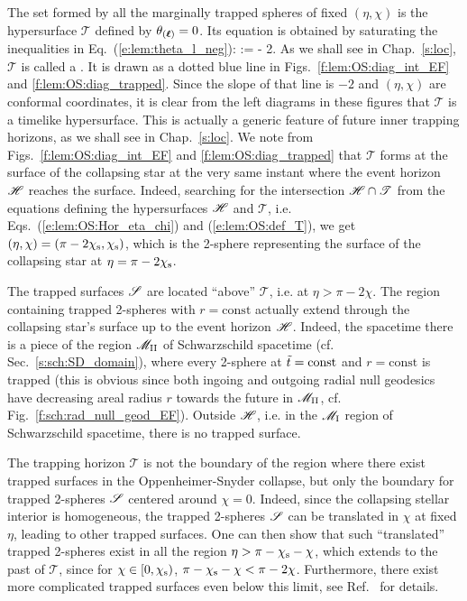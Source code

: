The set formed by all the marginally trapped spheres
of fixed $(\eta,\chi)$
is the hypersurface $\mathscr{T}$ defined by $\theta_{(\bm{\ell})} = 0$.
Its equation is obtained by saturating the inequalities
in Eq.~(\ref{e:lem:theta_l_neg}):
\be \label{e:lem:OS:def_T}
    :\qquad \eta = \pi - 2\chi.
\ee
As we shall see in
Chap.~\ref{s:loc}, $\mathscr{T}$ is called a
.
It is drawn as a dotted blue line in Figs.~\ref{f:lem:OS:diag_int_EF}
and \ref{f:lem:OS:diag_trapped}. Since the slope of that line is $-2$ and
$(\eta,\chi)$ are conformal coordinates, it is clear from the left diagrams
in these figures that $\mathscr{T}$ is a timelike hypersurface. This is
actually a generic feature of future inner trapping horizons, as we shall
see in Chap.~\ref{s:loc}. We note from Figs.~\ref{f:lem:OS:diag_int_EF}
and \ref{f:lem:OS:diag_trapped} that $\mathscr{T}$ forms at the surface of the
collapsing star at the very same instant where the event horizon $\mathscr{H}$
reaches the surface.
Indeed, searching for the intersection $\mathscr{H}\cap\mathscr{T}$ from the equations
defining the hypersurfaces $\mathscr{H}$ and $\mathscr{T}$, i.e. Eqs.~(\ref{e:lem:OS:Hor_eta_chi})
and (\ref{e:lem:OS:def_T}), we get
$(\eta,\chi) = (\pi - 2\chi_{\rm s}, \chi_{\rm s})$, which is the 2-sphere
representing the surface of the collapsing star at $\eta=\pi - 2 \chi_{\rm s}$.

The trapped surfaces $\mathscr{S}$ are located ``above'' $\mathscr{T}$, i.e. at
$\eta > \pi - 2 \chi$. The region containing trapped 2-spheres with $r=\mathrm{const}$ actually extend through the collapsing star's surface up to the event horizon $\mathscr{H}$. Indeed, the spacetime there
is a piece of the region $\mathscr{M}_{\rm II}$ of Schwarzschild spacetime (cf. Sec.~\ref{s:sch:SD_domain}),
where every 2-sphere at ${\tilde t} = \mathrm{const}$ and $r=\mathrm{const}$ is trapped (this is obvious
since both ingoing and outgoing radial null geodesics have decreasing areal radius $r$
towards the future in $\mathscr{M}_{\rm II}$, cf. Fig.~\ref{f:sch:rad_null_geod_EF}).
Outside $\mathscr{H}$, i.e. in the $\mathscr{M}_{\rm I}$ region of Schwarzschild spacetime, there is no trapped
surface.

\begin{remark}
The trapping horizon $\mathscr{T}$ is not the boundary of the region where there
exist trapped surfaces
in the Oppenheimer-Snyder collapse, but only the boundary for trapped 2-spheres $\mathscr{S}$
centered around $\chi=0$.
Indeed, since the collapsing stellar interior
is homogeneous, the trapped 2-spheres $\mathscr{S}$ can
be translated in $\chi$ at fixed $\eta$, leading to other trapped surfaces.
One can then show that such ``translated'' trapped 2-spheres exist in all the region
$\eta > \pi - \chi_{\rm s} - \chi$, which extends to the past of $\mathscr{T}$,
since for $\chi\in[0, \chi_{\rm s})$,  %
$ \pi - \chi_{\rm s} - \chi < \pi - 2\chi$.
Furthermore, there exist more complicated trapped surfaces even below
this limit, see Ref.~\cite{BengtJS13} for details.
\end{remark}


